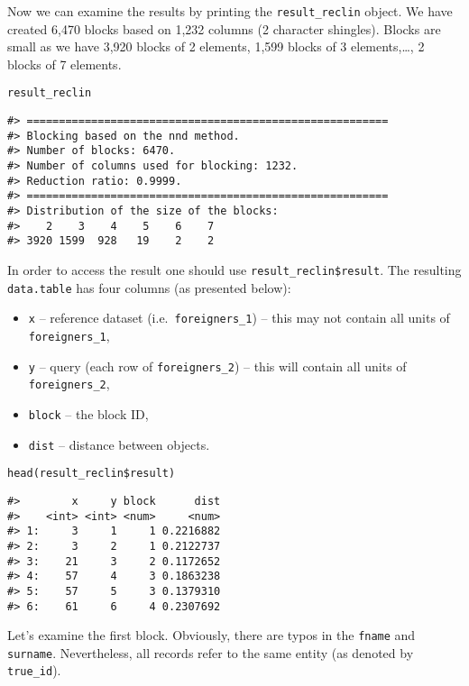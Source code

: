 Now we can examine the results by printing the
\texttt{result\_reclin} object. We have created
6,470
blocks based on 1,232
columns (2 character shingles). Blocks are small as we have
3,920 blocks of 2
elements, 1,599 blocks of
3 elements,\ldots,
2 blocks of
7 elements.

\begin{verbatim}
result_reclin
\end{verbatim}

\begin{verbatim}
#> ========================================================
#> Blocking based on the nnd method.
#> Number of blocks: 6470.
#> Number of columns used for blocking: 1232.
#> Reduction ratio: 0.9999.
#> ========================================================
#> Distribution of the size of the blocks:
#>    2    3    4    5    6    7 
#> 3920 1599  928   19    2    2
\end{verbatim}

In order to access the result one should use \texttt{result\_reclin\$result}. The
resulting \texttt{data.table} has four columns (as presented below):

\begin{itemize}
\tightlist
\item
  \texttt{x} -- reference dataset (i.e.~\texttt{foreigners\_1}) -- this may not
  contain all units of \texttt{foreigners\_1},
\item
  \texttt{y} -- query (each row of \texttt{foreigners\_2}) -- this will contain all
  units of \texttt{foreigners\_2},
\item
  \texttt{block} -- the block ID,
\item
  \texttt{dist} -- distance between objects.
\end{itemize}

\begin{verbatim}
head(result_reclin$result)
\end{verbatim}

\begin{verbatim}
#>        x     y block      dist
#>    <int> <int> <num>     <num>
#> 1:     3     1     1 0.2216882
#> 2:     3     2     1 0.2122737
#> 3:    21     3     2 0.1172652
#> 4:    57     4     3 0.1863238
#> 5:    57     5     3 0.1379310
#> 6:    61     6     4 0.2307692
\end{verbatim}

Let's examine the first block. Obviously, there are typos in the \texttt{fname}
and \texttt{surname}. Nevertheless, all records refer to the same entity (as denoted by \texttt{true\_id}).

